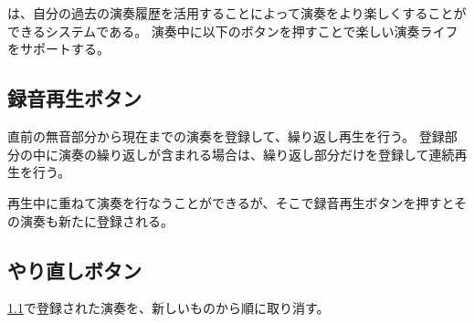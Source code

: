 \section{\system}
\label{repiano}

%

{\system}は、自分の過去の演奏履歴を活用することによって演奏をより楽しくすることができるシステムである。
演奏中に以下のボタンを押すことで楽しい演奏ライフをサポートする。

\subsection{録音再生ボタン}
\label{recplaybutton}
直前の無音部分から現在までの演奏を登録して、繰り返し再生を行う。
登録部分の中に演奏の繰り返しが含まれる場合は、繰り返し部分だけを登録して連続再生を行う。

再生中に重ねて演奏を行なうことができるが、そこで録音再生ボタンを押すとその演奏も新たに登録される。

\subsection{やり直しボタン}
\ref{recplaybutton}で登録された演奏を、新しいものから順に取り消す。

